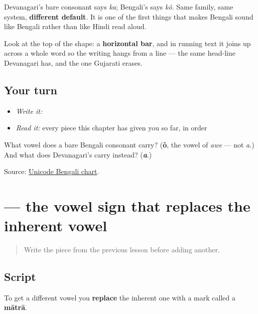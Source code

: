 Devanagari's bare consonant says \emph{ka}; Bengali's says \emph{kô}. Same family, same system, \textbf{different default}. It is one of the first things that makes Bengali sound like Bengali rather than like Hindi read aloud.

Look at the top of the shape: a \textbf{horizontal bar}, and in running text it joins up across a whole word so the writing hangs from a line — the same head-line Devanagari has, and the one Gujarati erases.

\subsection*{Your turn}
\begin{itemize}
\raggedright
  \item \emph{Write it:} 
  \item \emph{Read it:} every piece this chapter has given you so far, in order
\end{itemize}

\begin{tcolorbox}[breakable,colback=teal!4,colframe=teal!35!black,title={Before you move on}]
What vowel does a bare Bengali consonant carry? (\textbf{ô}, the vowel of \emph{awe} — not \emph{a}.) And what does Devanagari's carry instead? (\emph{\textbf{a}}.)

Source: \href{https://www.unicode.org/charts/PDF/U0980.pdf}{Unicode Bengali chart}.
\end{tcolorbox}
\section[-a]{ — the vowel sign that replaces the inherent vowel}

\label{lesson:BN-W01-aa-matra}



\begin{quote}
Write the piece from the previous lesson before adding another.
\end{quote}

\subsection*{Script}
To get a different vowel you \textbf{replace} the inherent one with a mark called a \textbf{mātrā}.

\begin{quote}
\end{quote}

